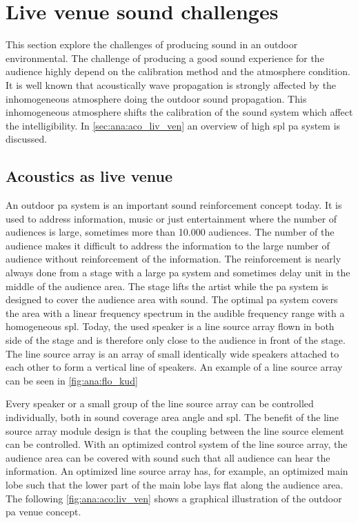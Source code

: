 \section{Live venue sound challenges}
This section explore the challenges of producing sound in an outdoor environmental. The challenge of producing a good sound experience for the audience highly depend on the calibration method and the atmosphere condition. It is well known that acoustically wave propagation is strongly affected by the inhomogeneous atmosphere doing the outdoor sound propagation. This inhomogeneous atmosphere shifts the calibration of the sound system which affect the intelligibility. In \autoref{sec:ana:aco_liv_ven} an overview of high \gls{spl} \gls{pa} system is discussed.



\subsection{Acoustics as live venue}\label{sec:ana:aco_liv_ven}
An outdoor \gls{pa} system is an important sound reinforcement concept today. It is used to address information, music or just entertainment where the number of audiences is large, sometimes more than 10.000 audiences. The number of the audience makes it difficult to address the information to the large number of audience without reinforcement of the information. The reinforcement is nearly always done from a stage with a large \gls{pa} system and sometimes delay unit in the middle of the audience area. The stage lifts the artist while the \gls{pa} system is designed to cover the audience area with sound. The optimal \gls{pa} system covers the area with a linear frequency spectrum in the audible frequency range with a homogeneous \gls{spl}. Today, the used speaker is a line source array flown in both side of the stage and is therefore only close to the audience in front of the stage. The line source array is an array of small identically wide speakers attached to each other to form a vertical line of speakers. An example of a line source array can be seen in \autoref{fig:ana:flo_kud}


Every speaker or a small group of the line source array can be controlled individually, both in sound coverage area angle and \gls{spl}. The benefit of the line source array module design is that the coupling between the line source element can be controlled. With an optimized control system of the line source array, the audience area can be covered with sound such that all audience can hear the information. An optimized line source array has, for example, an optimized main lobe such that the lower part of the main lobe lays flat along the audience area.
The following \autoref{fig:ana:aco:liv_ven} shows a graphical illustration of the outdoor \gls{pa} venue concept.

